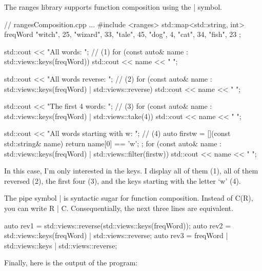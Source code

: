 The ranges library supports function composition using the | symbol.


\begin{cpp}
// rangesComposition.cpp
...
#include <ranges>
std::map<std::string, int> freqWord{ {"witch", 25}, {"wizard", 33}, {"tale", 45},
									 {"dog", 4}, {"cat", 34}, {"fish", 23} };

std::cout << "All words: "; // (1)
for (const auto& name : std::views::keys(freqWord)) { std::cout << name << " "; } \

std::cout << "All words reverse: "; // (2)
for (const auto& name : std::views::keys(freqWord) | std::views::reverse) {
	std::cout << name << " ";
}

std::cout << "The first 4 words: "; // (3)
for (const auto& name : std::views::keys(freqWord) | std::views::take(4)) {
	std::cout << name << " ";
}

std::cout << "All words starting with w: "; // (4)
auto firstw = [](const std::string& name){ return name[0] == 'w'; };
for (const auto& name : std::views::keys(freqWord) | std::views::filter(firstw)) {
	std::cout << name << " ";
}
\end{cpp}

In this case, I’m only interested in the keys. I display all of them (1), all of them reversed (2), the first four (3), and the keys starting with the letter ‘w’ (4).

The pipe symbol | is syntactic sugar for function composition. Instead of C(R), you can write R | C. Consequentially, the next three lines are equivalent.

\begin{cpp}
auto rev1 = std::views::reverse(std::views::keys(freqWord));
auto rev2 = std::views::keys(freqWord) | std::views::reverse;
auto rev3 = freqWord | std::views::keys | std::views::reverse;
\end{cpp}

Finally, here is the output of the program:


















